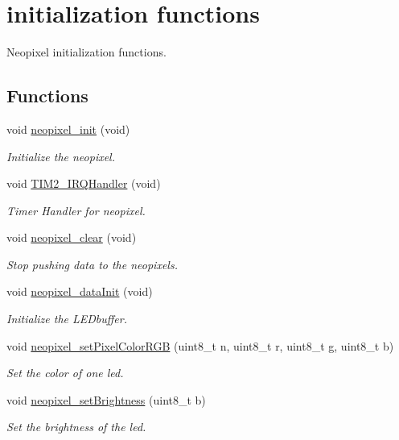 \hypertarget{group__neopixel}{}\section{initialization functions}
\label{group__neopixel}


Neopixel initialization functions.  


\subsection*{Functions}
\begin{DoxyCompactItemize}
\item 
void \hyperlink{group__neopixel_gaac78468985e44a3e4d353ea9276b33bc}{neopixel\+\_\+init} (void)
\begin{DoxyCompactList}\small\item\em Initialize the neopixel. \end{DoxyCompactList}\item 
void \hyperlink{group__neopixel_ga38ad4725462bdc5e86c4ead4f04b9fc2}{T\+I\+M2\+\_\+\+I\+R\+Q\+Handler} (void)
\begin{DoxyCompactList}\small\item\em Timer Handler for neopixel. \end{DoxyCompactList}\item 
void \hyperlink{group__neopixel_ga8e3cfef785ce221672f825f8785c25b8}{neopixel\+\_\+clear} (void)
\begin{DoxyCompactList}\small\item\em Stop pushing data to the neopixels. \end{DoxyCompactList}\item 
void \hyperlink{group__neopixel_ga79e34feddcfb2c45ae218166c84bdff4}{neopixel\+\_\+data\+Init} (void)
\begin{DoxyCompactList}\small\item\em Initialize the L\+E\+Dbuffer. \end{DoxyCompactList}\item 
void \hyperlink{group__neopixel_gadbf8ae449ade0b6015cb75632182b04c}{neopixel\+\_\+set\+Pixel\+Color\+R\+GB} (uint8\+\_\+t n, uint8\+\_\+t r, uint8\+\_\+t g, uint8\+\_\+t b)
\begin{DoxyCompactList}\small\item\em Set the color of one led. \end{DoxyCompactList}\item 
void \hyperlink{group__neopixel_gae027558106eef5c81996294f4561fecb}{neopixel\+\_\+set\+Brightness} (uint8\+\_\+t b)
\begin{DoxyCompactList}\small\item\em Set the brightness of the led. \end{DoxyCompactList}\end{DoxyCompactItemize}


